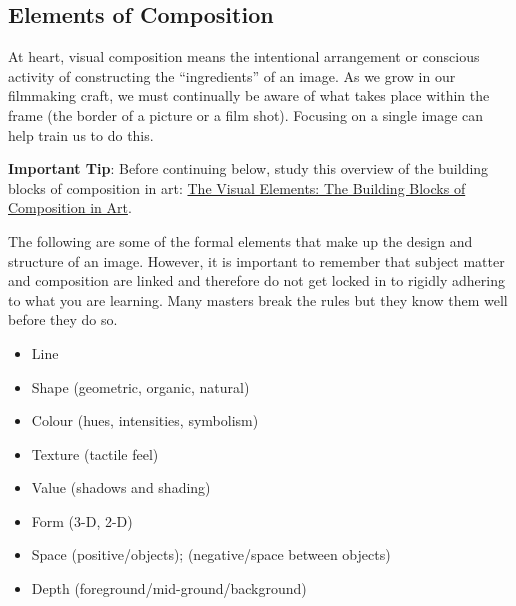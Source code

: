 \documentclass[
]{book}
\providecommand{\tightlist}{%
  \setlength{\itemsep}{0pt}\setlength{\parskip}{0pt}}
\begin{document}
\hypertarget{elements-of-composition}{%
\subsection*{Elements of Composition}\label{elements-of-composition}}

At heart, visual composition means the intentional arrangement or conscious activity of constructing the ``ingredients'' of an image. As we grow in our filmmaking craft, we must continually be aware of what takes place within the frame (the border of a picture or a film shot). Focusing on a single image can help train us to do this.

\begin{caution}
\textbf{Important Tip}: Before continuing below, study this overview of the building blocks of composition in art: \href{http://www.artyfactory.com/art_appreciation/visual-elements/visual-elements.html}{The Visual Elements: The Building Blocks of Composition in Art}.
\end{caution}

The following are some of the formal elements that make up the design and structure of an image. However, it is important to remember that subject matter and composition are linked and therefore do not get locked in to rigidly adhering to what you are learning. Many masters break the rules but they know them well before they do so.

\begin{itemize}
\tightlist
\item
  Line\\
\item
  Shape (geometric, organic, natural)\\
\item
  Colour (hues, intensities, symbolism)\\
\item
  Texture (tactile feel)\\
\item
  Value (shadows and shading)\\
\item
  Form (3-D, 2-D)\\
\item
  Space (positive/objects); (negative/space between objects)\\
\item
  Depth (foreground/mid-ground/background)
\end{itemize}
\end{document}
